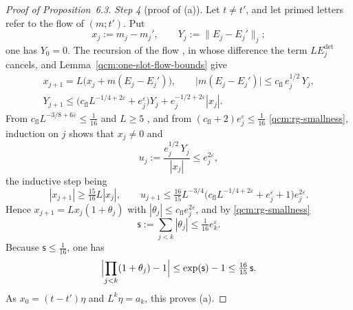\documentclass[11pt,letterpaper,reqno]{amsart}
\theoremstyle{definition}
\begin{document}
\begin{proof}[Proof of Proposition~6.3]
\emph{Step 4} (proof of (a)).
Let $t\ne t'$, and let primed letters refer to the flow of $(m;t')$.
Put
\begin{equation*}
x_j:=m_j-m_j',\qquad Y_j:=\|E_j-E_j'\|_j ;
\end{equation*}
one has $Y_0=0$.
The recursion of the flow \cite[Section~16.2, equations~(16.9)--(16.10)]{QEDConstruction}, in whose difference the term $LE^{\det}_j$ cancels, and Lemma~\ref{qcm:one-slot-flow-bounds} give
\begin{gather*}
x_{j+1}=L\bigl(x_j+m(E_j-E_j')\bigr),\qquad\bigl|m(E_j-E_j')\bigr|\le c_{\mathrm{fl}}\,e_j^{1/2}\,Y_j,\\
Y_{j+1}\le\bigl(c_{\mathrm{fl}}L^{-1/4+2\varepsilon}+e_j^{\varepsilon}\bigr)Y_j+e_j^{-1/2+2\varepsilon}|x_j| .
\end{gather*}
From $c_{\mathrm{fl}}L^{-3/8+6\bar\varepsilon}\le\frac1{16}$ and $L\ge5$ \cite[Proposition~24.1]{QEDConstruction}, and from $(c_{\mathrm{fl}}+2)e_j^{\varepsilon}\le\frac1{16}$ \eqref{qcm:rg-smallness}, induction on $j$ shows that $x_j\ne0$ and
\begin{equation*}
u_j:=\frac{e_j^{1/2}\,Y_j}{|x_j|}\le e_j^{2\varepsilon},
\end{equation*}
the inductive step being
\begin{equation*}
|x_{j+1}|\ge\tfrac{15}{16}L|x_j|,\qquad u_{j+1}\le\tfrac{16}{15}L^{-3/4}\bigl(c_{\mathrm{fl}}L^{-1/4+2\varepsilon}+e_j^{\varepsilon}+1\bigr)e_j^{2\varepsilon}.
\end{equation*}
Hence $x_{j+1}=Lx_j(1+\theta_j)$ with $|\theta_j|\le c_{\mathrm{fl}}e_j^{2\varepsilon}$, and by \eqref{qcm:rg-smallness}
\begin{equation*}
\mathsf s:=\sum_{j<k}|\theta_j|\le\tfrac1{16}e_k^{\varepsilon}.
\end{equation*}
Because $\mathsf s\le\frac1{16}$, one has
\begin{equation*}
\Bigl|\prod_{j<k}(1+\theta_j)-1\Bigr|\le\exp(\mathsf s)-1\le\tfrac{16}{15}\,\mathsf s .
\end{equation*}
As $x_0=(t-t')\eta$ and $L^k\eta=a_k$, this proves (a).


\end{proof}
\end{document}
